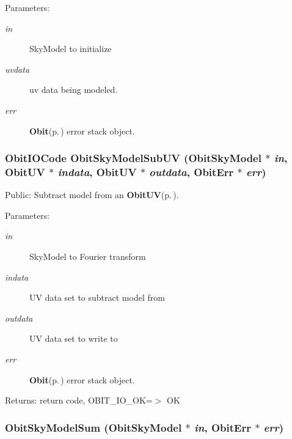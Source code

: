 \begin{Desc}
\item[Parameters:]
\begin{description}
\item[{\em in}]Sky\-Model to initialize \item[{\em uvdata}]uv data being modeled. \item[{\em err}]{\bf Obit}{\rm (p.\,\pageref{structObit})} error stack object. \end{description}
\end{Desc}
\subsubsection{\setlength{\rightskip}{0pt plus 5cm}Obit\-IOCode Obit\-Sky\-Model\-Sub\-UV ({\bf Obit\-Sky\-Model} $\ast$ {\em in}, {\bf Obit\-UV} $\ast$ {\em indata}, {\bf Obit\-UV} $\ast$ {\em outdata}, {\bf Obit\-Err} $\ast$ {\em err})}\label{ObitSkyModel_8c_a22}


Public: Subtract model from an {\bf Obit\-UV}{\rm (p.\,\pageref{structObitUV})}. 

\begin{Desc}
\item[Parameters:]
\begin{description}
\item[{\em in}]Sky\-Model to Fourier transform \item[{\em indata}]UV data set to subtract model from \item[{\em outdata}]UV data set to write to \item[{\em err}]{\bf Obit}{\rm (p.\,\pageref{structObit})} error stack object. \end{description}
\end{Desc}
\begin{Desc}
\item[Returns:]return code, OBIT\_\-IO\_\-OK=$>$ OK \end{Desc}
\subsubsection{ Obit\-Sky\-Model\-Sum ({\bf Obit\-Sky\-Model} $\ast$ {\em in}, {\bf Obit\-Err} $\ast$ {\em err})}\label{ObitSkyModel_8c_a30}


